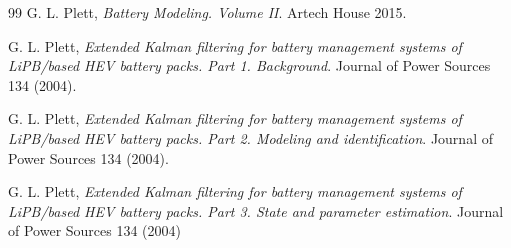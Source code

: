 \documentclass[11pt,a4paper]{article}
\numberwithin{equation}{section}
\theoremstyle{it}
\theoremstyle{definition}
\begin{document}
\begin{onehalfspace}
\begin{thebibliography}{99}
	G. L. Plett,  \emph{Battery Modeling. Volume II}. Artech House 2015.
	
	G. L. Plett,  \emph{Extended Kalman filtering for battery management systems of LiPB/based HEV battery packs. Part 1. Background}. Journal of Power Sources 134 (2004).
	
	G. L. Plett,  \emph{Extended Kalman filtering for battery management systems of LiPB/based HEV battery packs. Part 2. Modeling and identification}. Journal of Power Sources 134 (2004).	
	
	G. L. Plett,  \emph{Extended Kalman filtering for battery management systems of LiPB/based HEV battery packs. Part 3. State and parameter estimation}. Journal of Power Sources 134 (2004)	
	
\end{thebibliography}
\end{onehalfspace}
\end{document}
